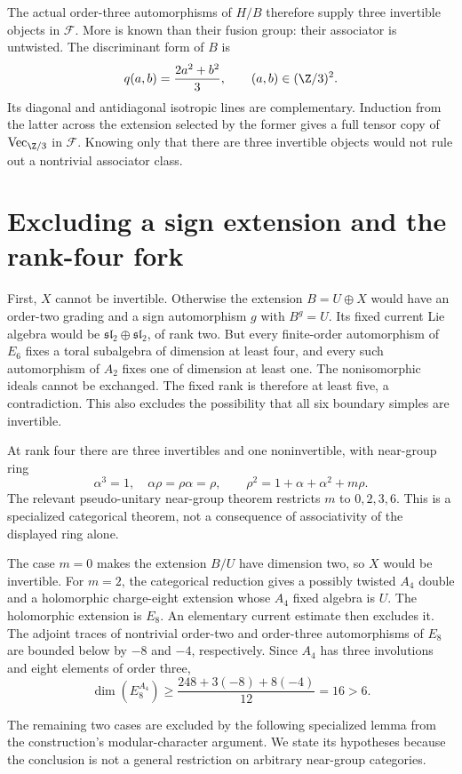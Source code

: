 The actual order-three automorphisms of $H/B$ therefore supply three
invertible objects in $\mathcal F$. More is known than their fusion group:
their associator is untwisted. The discriminant form of $B$ is
\[
 q(a,b)=\frac{2a^2+b^2}{3},\qquad(a,b)\in(\Z/3)^2.
\]
Its diagonal and antidiagonal isotropic lines are complementary.
Induction from the latter across the extension selected by the former
gives a full tensor copy of $\mathrm{Vec}_{\Z/3}$ in $\mathcal F$.
Knowing only that there are three invertible objects would not rule
out a nontrivial associator class.

\section{Excluding a sign extension and the rank-four fork}

First, $X$ cannot be invertible. Otherwise the extension $B=U\oplus X$
would have an order-two grading and a sign automorphism $g$ with
$B^g=U$. Its fixed current Lie algebra would be
$\mathfrak{sl}_2\oplus\mathfrak{sl}_2$, of rank two.
But every finite-order automorphism of $E_6$ fixes a toral subalgebra
of dimension at least four, and every such automorphism of $A_2$
fixes one of dimension at least one. The nonisomorphic ideals cannot
be exchanged. The fixed rank is therefore at least five, a
contradiction. This also excludes the possibility that all six
boundary simples are invertible.

At rank four there are three invertibles and one noninvertible, with
near-group ring
\[
 \alpha^3=1,\quad\alpha\rho=\rho\alpha=\rho,
 \qquad\rho^2=1+\alpha+\alpha^2+m\rho.
\]
The relevant pseudo-unitary near-group theorem restricts $m$ to
$0,2,3,6$. This is a specialized categorical theorem, not a consequence
of associativity of the displayed ring alone.

The case $m=0$ makes the extension $B/U$ have dimension two, so $X$
would be invertible. For $m=2$, the categorical reduction gives a
possibly twisted $A_4$ double and a holomorphic charge-eight extension
whose $A_4$ fixed algebra is $U$. The holomorphic extension is $E_8$.
An elementary current estimate then excludes it. The adjoint traces
of nontrivial order-two and order-three automorphisms of $E_8$ are
bounded below by $-8$ and $-4$, respectively. Since $A_4$ has three
involutions and eight elements of order three,
\[
 \dim(E_8^{A_4})\geq
 \frac{248+3(-8)+8(-4)}{12}=16>6.
\]

The remaining two cases are excluded by the following specialized
lemma from the construction's modular-character argument. We state
its hypotheses because the conclusion is not a general restriction
on arbitrary near-group categories.

